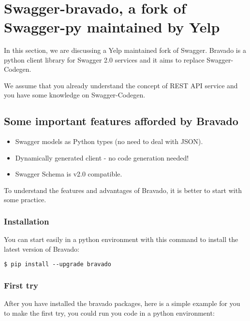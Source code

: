 \MDNAME\

\section{Swagger-bravado, a fork of Swagger-py maintained by Yelp}

In this section, we are discussing a Yelp maintained fork of Swagger.
Bravado is a python client library for Swagger 2.0 services and it aims
to replace Swagger-Codegen.

We assume that you already understand the concept of REST API service
and you have some knowledge on Swagger-Codegen.

\subsection{Some important features afforded by Bravado}

\begin{itemize}
\item
  Swagger models as Python types (no need to deal with JSON).
\item
  Dynamically generated client - no code generation needed!
\item
  Swagger Schema is v2.0 compatible.
\end{itemize}

To understand the features and advantages of Bravado, it is better to
start with some practice.

\subsubsection{Installation}

You can start easily in a python environment with this command to
install the latest version of Bravado:

\begin{lstlisting}
$ pip install --upgrade bravado
\end{lstlisting}

\subsubsection{First try}

After you have installed the bravado packages, here is a simple example
for you to make the first try, you could run you code in a python
environment:

